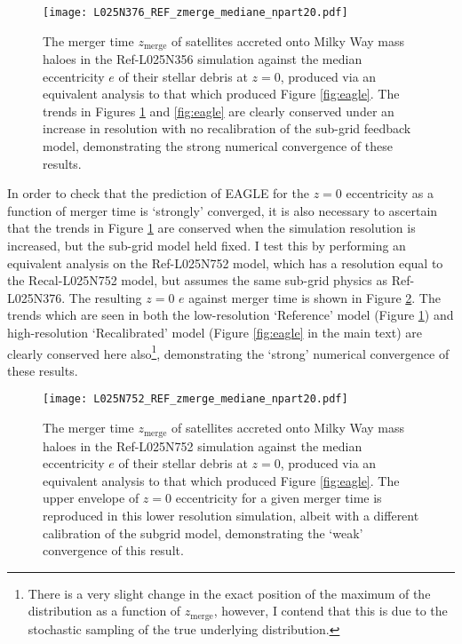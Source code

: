\begin{figure}
\texttt{[image: L025N376\_REF\_zmerge\_mediane\_npart20.pdf]}
\caption[A recreation of Figure \ref{fig:eagle} for haloes in the Ref-L025N356 simulation]{\label{fig:n356ref} The merger time $z_\mathrm{merge}$ of
satellites accreted onto Milky Way mass haloes in the Ref-L025N356
simulation against the median eccentricity $e$ of their stellar
debris at $z=0$, produced via an equivalent analysis to that which
produced Figure \ref{fig:eagle}. The trends in Figures \ref{fig:n356ref}
and \ref{fig:eagle} are clearly conserved under an increase in
resolution with no recalibration of the sub-grid feedback model,
demonstrating the strong numerical convergence of these results.}
\end{figure}

In order to check that the prediction of EAGLE for the $z=0$
eccentricity as a function of merger time is `strongly' converged,
it is also necessary to ascertain that the trends in Figure \ref{fig:n356ref}
are conserved when the simulation resolution is increased, but the sub-grid
model held fixed. I test this by performing an equivalent analysis
on the Ref-L025N752 model, which has a resolution equal to the
Recal-L025N752 model, but assumes the same sub-grid physics as
Ref-L025N376. The resulting $z=0$ $e$ against merger time is shown
in Figure \ref{fig:n752ref}. The trends which are seen in both the
low-resolution `Reference' model (Figure \ref{fig:n356ref}) and
high-resolution `Recalibrated' model (Figure \ref{fig:eagle} in the
main text) are clearly conserved here also\footnote{ There is a very slight change in the exact position of the maximum of the distribution as a function of $z_\mathrm{merge}$, however, I contend that this is due to the stochastic sampling of the true underlying distribution.}, demonstrating the
`strong' numerical convergence of these results.

\begin{figure}
\texttt{[image: L025N752\_REF\_zmerge\_mediane\_npart20.pdf]}
\caption[The equivalent of Figure \ref{fig:eagle} for haloes in the Ref-L025N752 simulation]{\label{fig:n752ref} The merger time $z_\mathrm{merge}$ of
satellites accreted onto Milky Way mass haloes in the Ref-L025N752
simulation against the median eccentricity $e$ of their stellar
debris at $z=0$, produced via an equivalent analysis to that which
produced Figure \ref{fig:eagle}. The upper envelope of $z=0$
eccentricity for a given merger time is reproduced in this lower
resolution simulation, albeit with a different calibration of the
subgrid model, demonstrating the `weak' convergence of this result.}
\end{figure}



